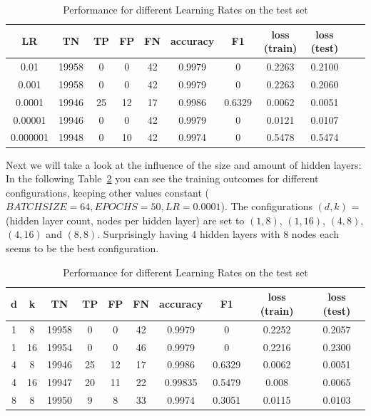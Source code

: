 \documentclass[utf8x]{ctexart}
\begin{document}
\begin{table}[ht]
  \centering
  \caption{Performance for different Learning Rates on the test set}
  \label{tab:lrcomparison}

  \begin{tabular}{c|cccccccccc}
    LR       & TN    & TP & FP & FN & accuracy & F1     & loss (train) & loss (test) \\
    \hline
    0.01     & 19958 & 0  & 0  & 42 & 0.9979   & 0      & 0.2263       & 0.2100      \\
    0.001    & 19958 & 0  & 0  & 42 & 0.9979   & 0      & 0.2263       & 0.2060      \\
    0.0001   & 19946 & 25 & 12 & 17 & 0.9986   & 0.6329 & 0.0062       & 0.0051      \\
    0.00001  & 19946 & 0  & 0  & 42 & 0.9979   & 0      & 0.0121       & 0.0107      \\
    0.000001 & 19948 & 0  & 10 & 42 & 0.9974   & 0      & 0.5478       & 0.5474      \\
  \end{tabular}

\end{table}

Next we will take a look at the influence of the size and amount of hidden layers: In the following Table~\ref{tab:sizecomparison} you can see the training outcomes for different configurations, keeping other values constant ($BATCH SIZE=64, EPOCHS=50, LR=0.0001$). The configurations $(d,k)$ = (hidden layer count, nodes per hidden layer) are set to $(1,8)$, $(1,16)$, $(4,8)$, $(4,16)$ and $(8,8)$. Surprisingly having 4 hidden layers with 8 nodes each seems to be the best configuration.


\begin{table}[ht]
  \centering
  \caption{Performance for different Learning Rates on the test set}
  \label{tab:sizecomparison}
  \begin{tabular}{cc|cccccccc}
    d & k  & TN    & TP & FP & FN & accuracy & F1     & loss (train) & loss (test) \\
    \hline
    1 & 8  & 19958 & 0  & 0  & 42 & 0.9979   & 0      & 0.2252       & 0.2057      \\
    1 & 16 & 19954 & 0  & 0  & 46 & 0.9979   & 0      & 0.2216       & 0.2300      \\
    4 & 8  & 19946 & 25 & 12 & 17 & 0.9986   & 0.6329 & 0.0062       & 0.0051      \\
    4 & 16 & 19947 & 20 & 11 & 22 & 0.99835  & 0.5479 & 0.008        & 0.0065      \\
    8 & 8  & 19950 & 9  & 8  & 33 & 0.9974   & 0.3051 & 0.0115       & 0.0103      \\
  \end{tabular}
\end{table}
\end{document}
